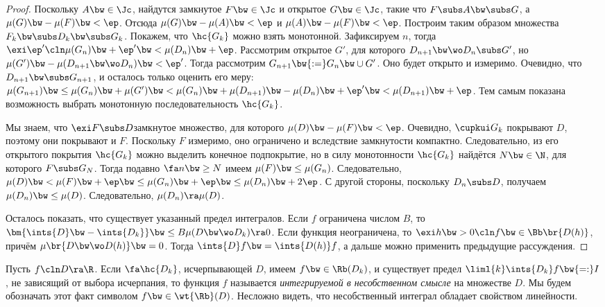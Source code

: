 \documentclass[a4paper]{article}
\newcommand{\Rbt}{\wt{\Rb}}
\begin{document}
\begin{proof}
Поскольку $A \bw\in \Jc$, найдутся замкнутое $F \bw\in \Jc$ и открытое $G \bw\in \Jc$, такие что $F \subs A
\bw\subs G$, а $\mu(G) \bw- \mu(F) \bw< \ep$. Отсюда $\mu(G) \bw- \mu(A) \bw< \ep$ и $\mu(A) \bw-
\mu(F) \bw< \ep$. Построим таким образом множества $F_k \bw\subs D_k \bw\subs G_k$. Покажем, что
$\hc{G_k}$ можно взять монотонной. Зафиксируем $n$, тогда $\exi \ep'\cln \mu(G_n) \bw+ \ep' \bw<
\mu(D_n) \bw+ \ep$. Рассмотрим открытое $G'$, для которого $D_{n+1}\bw\wo D_n \subs G'$, но
$\mu(G') \bw- \mu(D_{n+1} \bw\wo D_n) \bw< \ep'$. Тогда рассмотрим $G_{n+1} \bw{:=} G_n \bw\cup
G'$. Оно будет открыто и измеримо. Очевидно, что $D_{n+1} \bw\subs G_{n+1}$, и осталось только
оценить его меру: $\mu(G_{n+1}) \bw\le \mu(G_n) \bw+ \mu(G') \bw< \mu(G_n) \bw+ \mu(D_{n+1}) \bw-
\mu(D_n) \bw+ \ep' \bw< \mu(D_{n+1}) \bw+ \ep$. Тем самым показана возможность выбрать монотонную
последовательность $\hc{G_k}$.

Мы знаем, что $\exi F \subs D$\т замкнутое множество, для которого $\mu(D) \bw- \mu(F) \bw< \ep$.
Очевидно, $\cupkui G_k$ покрывают $D$, поэтому они покрывают и $F$. Поскольку $F$ измеримо, оно
ограничено и вследствие замкнутости компактно. Следовательно, из его открытого покрытия $\hc{G_k}$
можно выделить конечное подпокрытие, но в силу монотонности $\hc{G_k}$ найдётся $N \bw\in \N$, для
которого $F \subs G_N$. Тогда подавно $\fa n \bw\ge N$ имеем $\mu(F) \bw\le \mu(G_n)$. Следовательно,
$\mu(D) \bw< \mu(F) \bw+ \ep \bw\le \mu(G_n) \bw+ \ep \bw\le \mu(D_n) \bw+ 2\ep$. С другой стороны, поскольку $D_n
\subs D$, получаем $\mu(D_n) \bw\le \mu(D)$. Следовательно, $\mu(D_n) \ra \mu(D)$.

Осталось показать, что существует указанный предел интегралов. Если $f$ ограничена числом $B$, то
$\bm{\ints{D} \bw- \ints{D_k}} \bw\le B\mu(D\bw\wo D_k) \ra 0$. Если функция неограничена, то $\exi h \bw>0\cln
f \bw\in \Bb\br{D(h)}$, причём $\mu\br{D \bw\wo D(h)} \bw= 0$. Тогда $\ints{D} f \bw= \ints{D(h)}f$, а дальше
можно применить предыдущие рассуждения.
\end{proof}

\begin{df}
Пусть $f\cln D\ra \R$. Если $\fa \hc{D_k}$, исчерпывающей $D$, имеем $f \bw\in \Rb(D_k)$, и существует
предел $\liml{k} \ints{D_k} f \bw{=:} I$, не зависящий от выбора исчерпания, то функция $f$
называется \emph{интегрируемой в несобственном смысле} на множестве $D$. Мы будем обозначать этот
факт символом $f \bw\in \Rbt(D)$. Несложно видеть, что несобственный интеграл обладает свойством
линейности.
\end{df}
\end{document}
